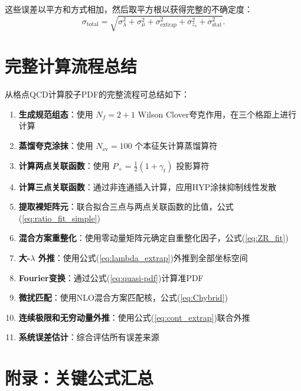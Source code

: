 \documentclass[11pt,a4paper]{article}
\begin{document}
这些误差以平方和方式相加，然后取平方根以获得完整的不确定度：
\begin{equation}
    \sigma_{\text{total}} = \sqrt{\sigma_{\lambda}^2 + \sigma_{\mu}^2 + \sigma_{\text{extrap}}^2 + \sigma_{z_s}^2 + \sigma_{\text{stat}}^2}.
\end{equation}

\section{完整计算流程总结}

从格点QCD计算胶子PDF的完整流程可总结如下：

\begin{enumerate}[label=\textbf{步骤 \arabic*}:, leftmargin=*]
    \item \textbf{生成规范组态}：使用 $N_f = 2+1$ Wilson Clover夸克作用，在三个格距上进行计算
    \item \textbf{蒸馏夸克涂抹}：使用 $N_{\text{ev}} = 100$ 个本征矢计算蒸馏算符
    \item \textbf{计算两点关联函数}：使用 $P_+ = \frac{1}{2}(1+\gamma_t)$ 投影算符
    \item \textbf{计算三点关联函数}：通过非连通插入计算，应用HYP涂抹抑制线性发散
    \item \textbf{提取裸矩阵元}：联合拟合三点与两点关联函数的比值，公式(\ref{eq:ratio_fit_simple})
    \item \textbf{混合方案重整化}：使用零动量矩阵元确定自重整化因子，公式(\ref{eq:ZR_fit})
    \item \textbf{大-$\lambda$ 外推}：使用公式(\ref{eq:lambda_extrap})外推到全部坐标空间
    \item \textbf{Fourier变换}：通过公式(\ref{eq:quasi-pdf})计算准PDF
    \item \textbf{微扰匹配}：使用NLO混合方案匹配核，公式(\ref{eq:Chybrid})
    \item \textbf{连续极限和无穷动量外推}：使用公式(\ref{eq:cont_extrap})联合外推
    \item \textbf{系统误差估计}：综合评估所有误差来源
\end{enumerate}

\section*{附录：关键公式汇总}
\end{document}

